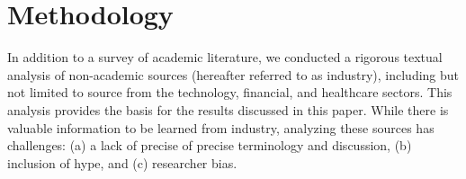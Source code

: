 
\section{Methodology}
\label{sec:method}

In addition to a survey of academic literature, we conducted a rigorous textual analysis of non-academic sources (hereafter referred to as industry),
including but not limited to source from the technology, financial, and healthcare sectors.
This analysis provides the basis for the results discussed in this paper.
While there is valuable information to be learned from industry, analyzing these sources has challenges: (a) a lack of precise of precise terminology and discussion, (b) inclusion of hype, and (c) researcher bias.

